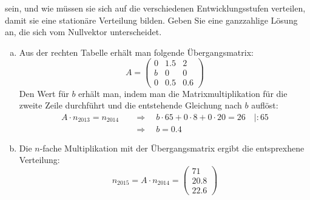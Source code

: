 \begin{exercise}
\begin{enumerate}[a)]
            sein, und wie müssen sie sich auf die
            verschiedenen Entwicklungsstufen
            verteilen, damit sie eine stationäre
            Verteilung bilden.
            Geben Sie eine ganzzahlige Lösung an,
            die sich vom Nullvektor unterscheidet.
    \end{enumerate}
  \fi
  \ifoutcome\outcome
    \begin{enumerate}[a)]
      \item Aus der rechten Tabelle erhält man
            folgende Übergangsmatrix:
            \begin{equation*}
              A=
              \begin{pmatrix}
                \num{0} & \num{1.5} & \num{2}   \\
                b       & \num{0}   & \num{0}   \\
                \num{0} & \num{0.5} & \num{0.6}
              \end{pmatrix}
            \end{equation*}
            Den Wert für $b$ erhält man, indem
            man die Matrixmultiplikation für die
            zweite Zeile durchführt und die
            entstehende Gleichung nach $b$
            auflöst:
            \begin{equation*}
              \begin{split}
                A\cdot n_{2013}=n_{2014}
                \quad&\Rightarrow\quad
                b\cdot65+0\cdot8+0\cdot20=26
                \quad|:65
                \\
                &\Rightarrow\quad
                b=\num{0.4}
              \end{split}
            \end{equation*}
      \item Die $n$-fache Multiplikation mit der
            Übergangsmatrix ergibt die entsprexhene
            Verteilung:
            \begin{equation*}
              n_{2015}=A\cdot n_{2014}=
              \begin{pmatrix}
                \num{71}   \\
                \num{20.8} \\
                \num{22.6}
              \end{pmatrix}

\end{equation*}
\end{enumerate}
\end{exercise}
